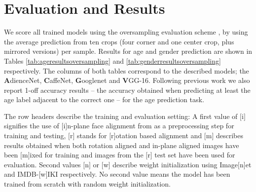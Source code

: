 \documentclass[10pt,twocolumn,letterpaper]{article}
\begin{document}
\section{Evaluation and Results}
\label{sec:evaluationandresults}

We score all trained models using the oversampling evaluation scheme \cite{levi2015age}, by using the average prediction from ten crops (four corner and one center crop, plus mirrored versions) per sample. Results for age and gender prediction are shown in Tables \ref{tab:ageresultsoversampling} and \ref{tab:genderresultsoversampling} respectively. The columns of both tables correspond to the described models; the \textbf{A}dienceNet, \textbf{C}affeNet, \textbf{G}ooglenet and \textbf{V}GG-16. Following previous work we also report 1-off accuracy results -- the accuracy obtained when predicting at least the age label adjacent to the correct one -- for the age prediction task.

The row headers describe the training and evaluation setting: A first value of $[$i$]$ signifies the use of $[$i$]$n-plane face alignment from \cite{eidinger2014age} as a preprocessing step for training and testing, $[$r$]$ stands for $[$r$]$otation based alignment and $[$m$]$ describes results obtained when both rotation aligned and in-plane aligned images have been $[$m$]$ixed for training and images from the $[$r$]$ test set have been used for evaluation. Second values $[$n$]$ or $[$w$]$ describe weight initialization using Image$[$n$]$et  and IMDB-$[$w$]$IKI respectively. No second value means the model has been trained from scratch with random weight initialization.
\end{document}
